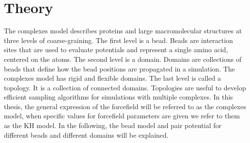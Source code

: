 \documentclass[12pt, twoside]{report}
\begin{document}
\chapter{Theory}

The complexes model describes proteins and large macromolecular structures at
three levels of coarse-graining. The first level is a bead. Beads are
interaction sites that are used to evaluate potentials and represent a single
amino acid, centered on the \calpha atoms. The second level is a domain. Domains
are collections of beads that define how the bead positions are propagated in a
simulation. The complexes model has rigid and flexible domains. The last level
is called a topology. It is a collection of connected domains. Topologies are
useful to develop efficient sampling algorithms for simulations with multiple
complexes. In this thesis, the general expression of the forcefield will be
referred to as the complexes model, when specific values for forcefield
parameters are given we refer to them as the \gls{KH} model. In the following,
the bead model and pair potential for different beads and different domains will
be explained.
\end{document}
